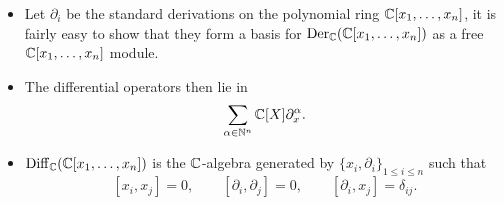 \documentclass[a4paper]{article}
\def\Diff{\operatorname{Diff}}
\begin{document}
\begin{itemize}
    \item Let $\partial_i$ be the standard derivations on the polynomial ring $\mathbb{C}[x_1,\dots,x_n]$, it is fairly easy to show that they form a basis for $\operatorname{Der}_{\mathbb{C}}(\mathbb{C}[x_1,\dots,x_n])$ as a free $\mathbb{C}[x_1,\dots,x_n]$ module.
    \item The differential operators then lie in
        \[
            \sum_{\alpha \in \mathbb{N}^n} \mathbb{C}[X] \partial_x^{\alpha}.
        \]
    \item $\Diff_\bC(\bC[x_1,\dots,x_n])$ is the $\mathbb{C}$-algebra generated by $\{x_i, \partial_i\}_{1\leq i \leq n}$ such that
        \[
            [x_i, x_j] = 0, \qquad [\partial_i, \partial_j] = 0, \qquad [\partial_i, x_j] = \delta_{ij}.
        \]
\end{itemize}

\newpage
\end{document}
